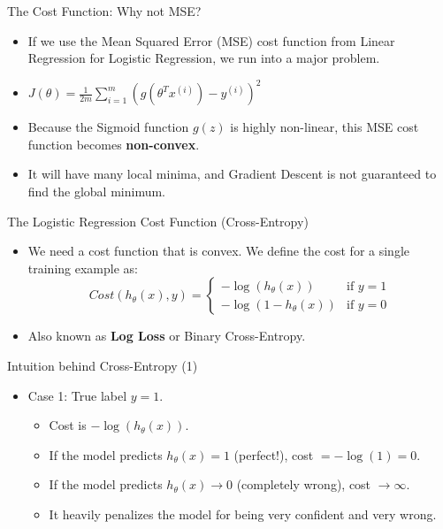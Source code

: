 \documentclass[aspectratio=169]{beamer}
\begin{document}
\begin{frame}{The Cost Function: Why not MSE?}
\begin{itemize}
    \item If we use the Mean Squared Error (MSE) cost function from Linear Regression for Logistic Regression, we run into a major problem.
    \item $J(\theta) = \frac{1}{2m} \sum_{i=1}^{m} (g(\theta^T x^{(i)}) - y^{(i)})^2$
    \item Because the Sigmoid function $g(z)$ is highly non-linear, this MSE cost function becomes \textbf{non-convex}.
    \item It will have many local minima, and Gradient Descent is not guaranteed to find the global minimum.
\end{itemize}
\end{frame}

\begin{frame}{The Logistic Regression Cost Function (Cross-Entropy)}
\begin{itemize}
    \item We need a cost function that is convex. We define the cost for a single training example as:
    $$ Cost(h_\theta(x), y) = \begin{cases} -\log(h_\theta(x)) & \text{if } y = 1 \\ -\log(1 - h_\theta(x)) & \text{if } y = 0 \end{cases} $$
    \item Also known as \textbf{Log Loss} or Binary Cross-Entropy.
\end{itemize}
\end{frame}

\begin{frame}{Intuition behind Cross-Entropy (1)}
\begin{itemize}
    \item Case 1: True label $y = 1$.
        \begin{itemize}
            \item Cost is $-\log(h_\theta(x))$.
            \item If the model predicts $h_\theta(x) = 1$ (perfect!), cost $= -\log(1) = 0$.
            \item If the model predicts $h_\theta(x) \rightarrow 0$ (completely wrong), cost $\rightarrow \infty$.
            \item It heavily penalizes the model for being very confident and very wrong.
        \end{itemize}
\end{itemize}
\end{frame}
\end{document}
